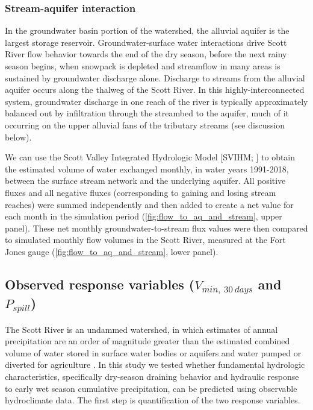 \documentclass[hess, manuscript]{copernicus}
\begin{document}
\subsubsection{Stream-aquifer interaction}

In the groundwater basin portion of the watershed, the alluvial aquifer
is the largest storage reservoir. Groundwater-surface water interactions
drive Scott River flow behavior towards the end of the dry season,
before the next rainy season begins, when snowpack is depleted and
streamflow in many areas is sustained by groundwater discharge alone.
Discharge to streams from the alluvial aquifer occurs along the thalweg
of the Scott River. In this highly-interconnected system, groundwater
discharge in one reach of the river is typically approximately balanced
out by infiltration through the streambed to the aquifer, much of it
occurring on the upper alluvial fans of the tributary streams (see
discussion below).

We can use the Scott Valley Integrated Hydrologic Model {[}SVIHM;
\citet{Tolley2019}{]} to obtain the estimated volume of water exchanged
monthly, in water years 1991-2018, between the surface stream network
and the underlying aquifer. All positive fluxes and all negative fluxes
(corresponding to gaining and losing stream reaches) were summed
independently and then added to create a net value for each month in the
simulation period (\autoref{fig:flow_to_aq_and_stream}, upper panel).
These net monthly groundwater-to-stream flux values were then compared
to simulated monthly flow volumes in the Scott River, measured at the
Fort Jones gauge (\autoref{fig:flow_to_aq_and_stream}, lower panel).

\subsection{\texorpdfstring{Observed response variables
(\(V_{min,~30~days}\) and
\(P_{spill}\))}{Observed response variables (V\_\{min,\textasciitilde30\textasciitilde days\} and P\_\{spill\})}}

The Scott River is an undammed watershed, in which estimates of annual
precipitation are an order of magnitude greater than the estimated
combined volume of water stored in surface water bodies or aquifers and
water pumped or diverted for agriculture \citep{Tolley2019}. In this
study we tested whether fundamental hydrologic characteristics,
specifically dry-season draining behavior and hydraulic response to
early wet season cumulative precipitation, can be predicted using
observable hydroclimate data. The first step is quantification of the
two response variables.
\end{document}
